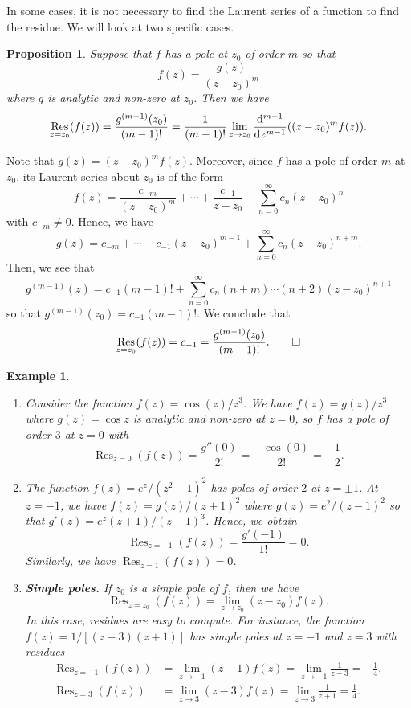\documentclass[10pt]{article}
\makeatletter
\DeclareMathOperator{\Res}{Res}
\theoremstyle{newstyle}
\newtheorem{prop}[thm]{Proposition}
\newtheorem{exmp}[thm]{Example}
\newenvironment{pf}[1][\proofname]{\par
  \pushQED{\qed}%
  \normalfont \topsep0\p@\relax
  \trivlist
  \item[\hskip\labelsep\scshape
  #1\@addpunct{.}]\ignorespaces
}{%
  \popQED\endtrivlist\@endpefalse
}
\makeatother
\begin{document}
In some cases, it is not necessary to find the Laurent series of a function to find the 
residue. We will look at two specific cases. 

\begin{prop}
Suppose that $f$ has a pole at $z_0$ of order $m$ so that 
\[ f(z) = \frac{g(z)}{(z-z_0)^m} \]
where $g$ is analytic and non-zero at $z_0$. Then we have 
\[ \Res_{z=z_0}(f(z)) = \frac{g^{(m-1)}(z_0)}{(m-1)!} = \frac{1}{(m-1)!} 
\lim_{z\to z_0} \frac{{\rm d}^{m-1}}{{\rm d}z^{m-1}} ((z-z_0)^m f(z)). \]
\end{prop}
\begin{pf}
Note that $g(z) = (z-z_0)^m f(z)$. Moreover, since $f$ has a pole of order $m$ at $z_0$, 
its Laurent series about $z_0$ is of the form 
\[ f(z) = \frac{c_{-m}}{(z-z_0)^m} + \cdots + \frac{c_{-1}}{z-z_0} + \sum_{n=0}^\infty c_n(z-z_0)^n \]
with $c_{-m} \neq 0$. Hence, we have 
\[ g(z) = c_{-m} + \cdots + c_{-1}(z-z_0)^{m-1} + \sum_{n=0}^\infty c_n(z-z_0)^{n+m}. \] 
Then, we see that 
\[ g^{(m-1)}(z) = c_{-1}(m-1)! + \sum_{n=0}^\infty c_n(n+m)\cdots (n+2)(z-z_0)^{n+1} \]
so that $g^{(m-1)}(z_0) = c_{-1}(m-1)!$. We conclude that 
\[ \Res_{z=z_0}(f(z)) = c_{-1} = \frac{g^{(m-1)}(z_0)}{(m-1)!}. \qedhere \]
\end{pf}

\begin{exmp}~
\begin{enumerate}[(1)]
    \item Consider the function $f(z) = \cos(z)/z^3$. We have $f(z) = g(z)/z^3$ where $g(z) = \cos z$ 
    is analytic and non-zero at $z = 0$, so $f$ has a pole of order $3$ at $z = 0$ with 
    \[ \Res_{z=0}(f(z)) = \frac{g''(0)}{2!} = \frac{-\cos(0)}{2!} = -\frac12. \]
    \item The function $f(z) = e^z/(z^2-1)^2$ has poles of order $2$ at $z = \pm1$. At $z = -1$, 
    we have $f(z) = g(z)/(z+1)^2$ where $g(z) = e^2/(z-1)^2$ so that $g'(z) = e^z(z+1)/(z-1)^3$. 
    Hence, we obtain 
    \[ \Res_{z=-1}(f(z)) = \frac{g'(-1)}{1!} = 0. \]
    Similarly, we have $\Res_{z=1}(f(z)) = 0$. 
    \item {\bf Simple poles.} If $z_0$ is a simple pole of $f$, then we have 
    \[ \Res_{z=z_0}(f(z)) = \lim_{z\to z_0} (z-z_0)f(z). \]
    In this case, residues are easy to compute. For instance, the function $f(z) = 
    1/[(z-3)(z+1)]$ has simple poles at $z = -1$ and $z = 3$ with residues 
    \begin{align*}
        \Res_{z=-1}(f(z)) &= \lim_{z\to-1} (z+1)f(z) = \lim_{z\to-1} \frac{1}{z-3} = -\frac14, \\
        \Res_{z=3}(f(z)) &= \lim_{z\to3} (z-3)f(z) = \lim_{z\to3} \frac{1}{z+1} = \frac14.
    \end{align*}
\end{enumerate}
\end{exmp}
\end{document}
